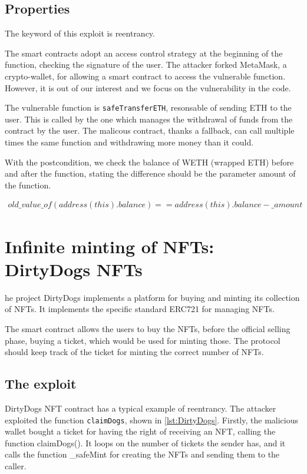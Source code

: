 \subsection{Properties}
The keyword of this exploit is reentrancy. 

The smart contracts adopt an access control strategy at the beginning of the function, checking the signature of the user. 
The attacker forked MetaMask, a crypto-wallet, for allowing a smart contract to 
access the vulnerable function. However, it is out of our interest and we focus on the vulnerability in the code.

The vulnerable function is \texttt{safeTransferETH}, resonsable of sending ETH to the user. This is called by the one which manages 
the withdrawal of funds from the contract by the user. The malicous contract, 
thanks a fallback, can call multiple times the same function and withdrawing more money than it could.

With the postcondition, we check the balance of WETH (wrapped ETH) before and after the function, 
stating the difference should be the parameter amount of the function.

\begin{equation}
    \begin{split}
        old\_value\_of(address(this).balance) == address(this).balance - \_amount
    \end{split}
\end{equation}



\section{Infinite minting of NFTs: DirtyDogs NFTs}   
\label{sec:Exploits:DirtyDogs}

he project DirtyDogs implements a platform for buying and minting its collection of NFTs.
It implements the specific standard ERC721 for managing NFTs. 

The smart contract allows the users to buy the NFTs, before the official selling phase, buying a ticket, which would be used for minting those.
The protocol should keep track of the ticket for minting the correct number of NFTs.

\subsection{The exploit}
\label{sec:DirtyDogs:Exploit}
DirtyDogs NFT contract has a typical example of reentrancy.
The attacker exploited the function \texttt{claimDogs}, shown in \autoref{lst:DirtyDogs}.
Firstly, the malicious wallet bought a ticket for having the right of receiving an NFT, calling the function claimDogs().
It loops on the number of tickets the sender has, and it calls the function \_safeMint for creating the NFTs and sending them to 
the caller.


